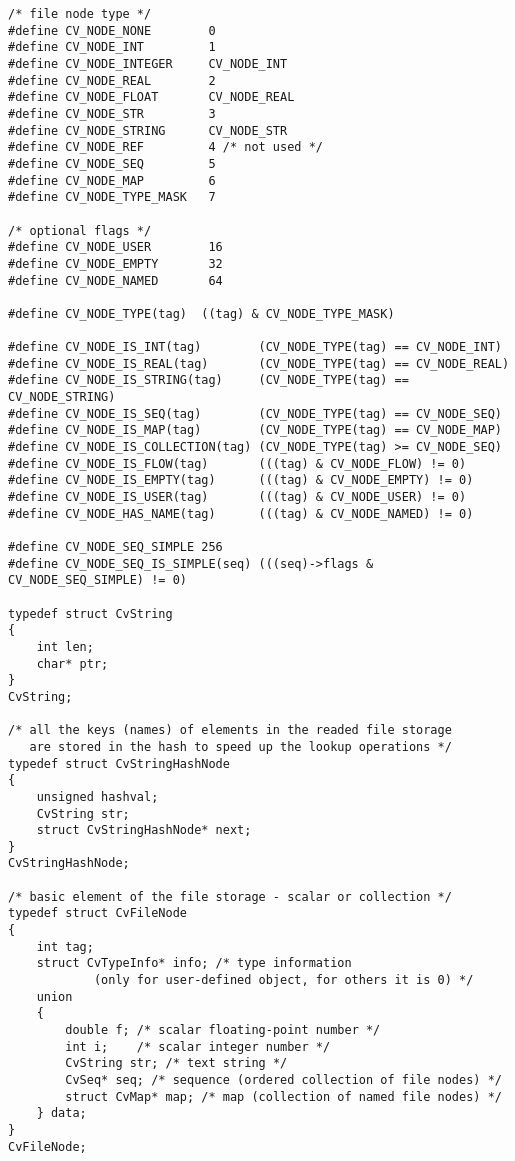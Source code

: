 \begin{lstlisting}
/* file node type */
#define CV_NODE_NONE        0
#define CV_NODE_INT         1
#define CV_NODE_INTEGER     CV_NODE_INT
#define CV_NODE_REAL        2
#define CV_NODE_FLOAT       CV_NODE_REAL
#define CV_NODE_STR         3
#define CV_NODE_STRING      CV_NODE_STR
#define CV_NODE_REF         4 /* not used */
#define CV_NODE_SEQ         5
#define CV_NODE_MAP         6
#define CV_NODE_TYPE_MASK   7

/* optional flags */
#define CV_NODE_USER        16
#define CV_NODE_EMPTY       32
#define CV_NODE_NAMED       64

#define CV_NODE_TYPE(tag)  ((tag) & CV_NODE_TYPE_MASK)

#define CV_NODE_IS_INT(tag)        (CV_NODE_TYPE(tag) == CV_NODE_INT)
#define CV_NODE_IS_REAL(tag)       (CV_NODE_TYPE(tag) == CV_NODE_REAL)
#define CV_NODE_IS_STRING(tag)     (CV_NODE_TYPE(tag) == CV_NODE_STRING)
#define CV_NODE_IS_SEQ(tag)        (CV_NODE_TYPE(tag) == CV_NODE_SEQ)
#define CV_NODE_IS_MAP(tag)        (CV_NODE_TYPE(tag) == CV_NODE_MAP)
#define CV_NODE_IS_COLLECTION(tag) (CV_NODE_TYPE(tag) >= CV_NODE_SEQ)
#define CV_NODE_IS_FLOW(tag)       (((tag) & CV_NODE_FLOW) != 0)
#define CV_NODE_IS_EMPTY(tag)      (((tag) & CV_NODE_EMPTY) != 0)
#define CV_NODE_IS_USER(tag)       (((tag) & CV_NODE_USER) != 0)
#define CV_NODE_HAS_NAME(tag)      (((tag) & CV_NODE_NAMED) != 0)

#define CV_NODE_SEQ_SIMPLE 256
#define CV_NODE_SEQ_IS_SIMPLE(seq) (((seq)->flags & CV_NODE_SEQ_SIMPLE) != 0)

typedef struct CvString
{
    int len;
    char* ptr;
}
CvString;

/* all the keys (names) of elements in the readed file storage
   are stored in the hash to speed up the lookup operations */
typedef struct CvStringHashNode
{
    unsigned hashval;
    CvString str;
    struct CvStringHashNode* next;
}
CvStringHashNode;

/* basic element of the file storage - scalar or collection */
typedef struct CvFileNode
{
    int tag;
    struct CvTypeInfo* info; /* type information
            (only for user-defined object, for others it is 0) */
    union
    {
        double f; /* scalar floating-point number */
        int i;    /* scalar integer number */
        CvString str; /* text string */
        CvSeq* seq; /* sequence (ordered collection of file nodes) */
        struct CvMap* map; /* map (collection of named file nodes) */
    } data;
}
CvFileNode;
\end{lstlisting}

